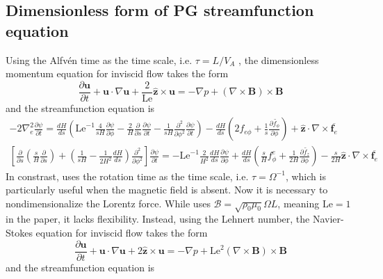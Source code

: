 \subsection{Dimensionless form of PG streamfunction equation}

Using the Alfvén time as the time scale, i.e. $\tau = L/V_A$ \parencite{holdenried-chernoff_long_2021}, the dimensionless momentum equation for inviscid flow takes the form
\[
    \frac{\partial \mathbf{u}}{\partial t} + \mathbf{u}\cdot \nabla \mathbf{u} + \frac{2}{\mathrm{Le}}\hat{\mathbf{z}}\times \mathbf{u} = -\nabla p + (\nabla\times\mathbf{B})\times \mathbf{B}
\]
and the streamfunction equation is
\[\begin{gathered}
    -2\nabla_e^2 \frac{\partial \psi}{\partial t} = \frac{dH}{ds} \left(\mathrm{Le}^{-1}\frac{4}{sH}\frac{\partial \psi}{\partial \phi} - \frac{2}{H}\frac{\partial}{\partial s}\frac{\partial \psi}{\partial t} - \frac{1}{sH}\frac{\partial^2}{\partial \phi^2}\frac{\partial \psi}{\partial t}\right) - \frac{dH}{ds}\left(2f_{e\phi} + \frac{1}{s}\frac{\partial \widetilde{f_\phi}}{\partial \phi}\right) + \hat{\mathbf{z}}\cdot \nabla\times \overline{\mathbf{f}_e} \\ 
    \left[\frac{\partial}{\partial s}\left(\frac{s}{H}\frac{\partial}{\partial s}\right) + \left(\frac{1}{sH} - \frac{1}{2H^2} \frac{dH}{ds}\right)\frac{\partial^2}{\partial \phi^2}\right] \frac{\partial \psi}{\partial t} = - \mathrm{Le}^{-1}\frac{2}{H^2}\frac{dH}{ds} \frac{\partial \psi}{\partial \phi} + \frac{dH}{ds} \left(\frac{s}{H} f_\phi^e + \frac{1}{2H}\frac{\partial \widetilde{f_z}}{\partial \phi}\right) - \frac{s}{2H}\hat{\mathbf{z}}\cdot \nabla\times \overline{\mathbf{f}_e}
\end{gathered}
\]
In constrast, \textcite{jackson_plesio-geostrophy_2020} uses the rotation time as the time scale, i.e. $\tau = \Omega^{-1}$, which is particularly useful when the magnetic field is absent. Now it is necessary to nondimensionalize the Lorentz force. While \textcite{jackson_plesio-geostrophy_2020} uses $\mathscr{B} = \sqrt{\rho_0 \mu_0} \Omega L$, meaning $\mathrm{Le} = 1$ in the paper, it lacks flexibility. Instead, using the Lehnert number, the Navier-Stokes equation for inviscid flow takes the form
\[
    \frac{\partial \mathbf{u}}{\partial t} + \mathbf{u}\cdot \nabla \mathbf{u} + 2\hat{\mathbf{z}}\times \mathbf{u} = -\nabla p + \mathrm{Le}^2(\nabla\times\mathbf{B})\times \mathbf{B}
\]
and the streamfunction equation is
